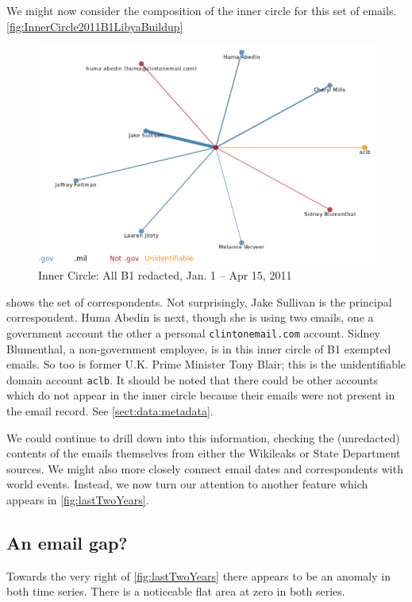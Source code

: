 \documentclass[journal]{vgtc}                %
\begin{document}
We might now consider the composition of the inner circle for this set of emails.  \autoref{fig:InnerCircle2011B1LibyaBuildup} 
\begin{figure}[h]
\begin{center}
\includegraphics[width=0.95\linewidth]{InnerCircle2011B1LibyaBuildup}
\caption{Inner Circle: All  B1 redacted, Jan. 1 -- Apr 15, 2011}
\label{fig:InnerCircle2011B1LibyaBuildup}
\end{center}
\end{figure}
shows the set of correspondents.  Not surprisingly, Jake Sullivan is the principal correspondent.  Huma Abedin is next, though she is using two emails, one a government account the other a personal \texttt{clintonemail.com} account.   Sidney Blumenthal, a non-government employee, is in this inner circle of B1 exempted emails.  So too is former U.K. Prime Minister Tony Blair; this is the unidentifiable domain account \texttt{aclb}.
It should be noted that there could be other accounts which do not appear in the inner circle because their emails were not present in the email record.  See \autoref{sect:data:metadata}.

We could continue to drill down into this information, checking the (unredacted) contents of the emails themselves from either the Wikileaks or State Department sources.  We might also more closely connect email dates and correspondents with world events.   Instead, we now turn our attention to another feature which appears in \autoref{fig:lastTwoYears}.

\subsection{An email gap?}
\label{sect:emailGap}
Towards the very right of \autoref{fig:lastTwoYears} there appears to be an anomaly in both time series.  There is a noticeable flat area at zero in both series.  
\end{document}
